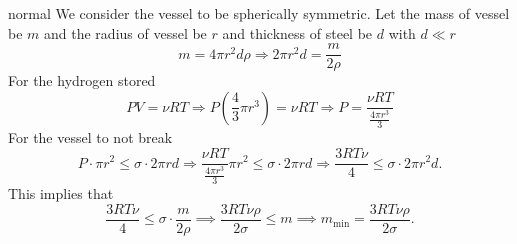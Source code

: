 \begin{solution}{normal}
We consider the vessel to be spherically symmetric. Let the mass of vessel be $m$ and the radius of vessel be $r$ and thickness of steel be $d$ with $d\ll r$
$$m = 4\pi r^2 d \rho \Rightarrow 2\pi r^2 d = \frac{m}{2\rho}$$
For the hydrogen stored $$PV = \nu RT \Rightarrow P\left(\frac{4}{3}\pi r^3\right)= \nu RT\Rightarrow P = \frac{\nu RT}{\frac{4\pi r^3}{3}}$$
For the vessel to not break $$P\cdot \pi r^2 \leq \sigma\cdot 2\pi rd \Rightarrow \frac{\nu RT}{\frac{4\pi r^3}{3}}\pi r^2 \leq \sigma\cdot 2\pi rd \Rightarrow \frac{3RT\nu}{4} \leq \sigma \cdot2\pi r^2 d.$$
This implies that
$$\frac{3RT\nu}{4} \leq \sigma\cdot \frac{m}{2\rho}\implies \frac{3RT\nu \rho}{2\sigma} \leq m \implies m_{\text{min}} = \frac{3RT\nu\rho}{2\sigma}.$$
\end{solution}